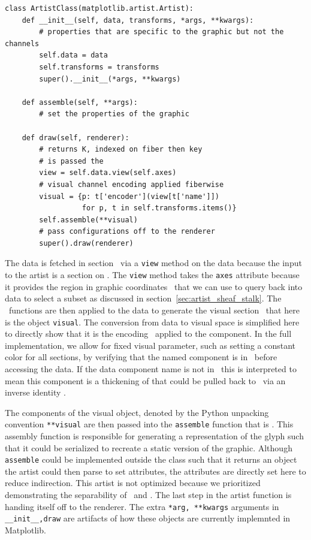 \documentclass[../main.tex]{subfiles}
\begin{document}
\begin{verbatim}
class ArtistClass(matplotlib.artist.Artist):
    def __init__(self, data, transforms, *args, **kwargs):
        # properties that are specific to the graphic but not the channels
        self.data = data 
        self.transforms = transforms
        super().__init__(*args, **kwargs)

    def assemble(self, **args):
        # set the properties of the graphic

    def draw(self, renderer):
        # returns K, indexed on fiber then key 
        # is passed the 
        view = self.data.view(self.axes) 
        # visual channel encoding applied fiberwise 
        visual = {p: t['encoder'](view[t['name']])
                  for p, t in self.transforms.items()}
        self.assemble(**visual)
        # pass configurations off to the renderer
        super().draw(renderer)
\end{verbatim}

The data is fetched in section \dsection\ via a \texttt{view} method on the data because the input to the artist is a section on \dtotal. The \texttt{view} method takes the \texttt{axes} attribute because it provides the region in graphic coordinates \gbase\ that we can use to query back into data to select a subset as discussed in section~\ref{sec:artist_sheaf_stalk}. The \vchannel\ functions are then applied to the data to generate the visual section \vsection\ that here is the object \texttt{visual}. The conversion from data to visual space is simplified here to directly show that it is the encoding \vchannel\ applied to the component. In the full implementation, we allow for fixed visual parameter, such as setting a constant color for all sections, by verifying that the named component is in \dfiber\ before accessing the data. If the data component name is not in \dfiber\, this is interpreted to mean this component is a thickening of \vtotal that could be pulled back to \dtotal\ via an inverse identity \vchannel. 

The components of the visual object, denoted by the Python unpacking convention \texttt{**visual} are then passed into the \texttt{assemble} function that is \vmarkd. This assembly function is responsible for generating a representation of the glyph such that it could be serialized to recreate a static version of the graphic. Although \texttt{assemble} could be implemented outside the class such that it returns an object the artist could then parse to set attributes, the attributes are directly set here to reduce indirection. This artist is not optimized because we prioritized demonstrating the separability of \vchannel\ and \vmarkd. The last step in the artist function is handing itself off to the renderer. The extra \texttt{*arg, **kwargs} arguments in \texttt{__init__,draw} are artifacts of how these objects are currently implemnted in Matplotlib. 
\end{document}
